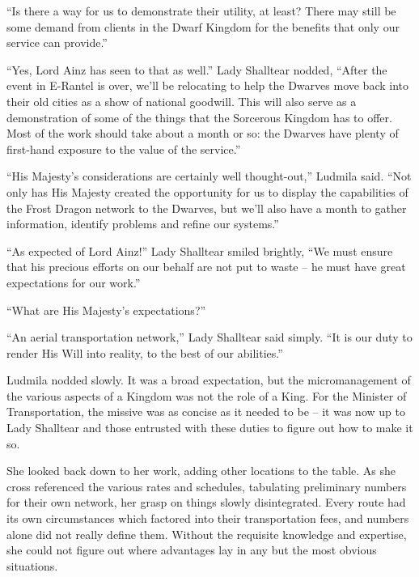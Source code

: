 “Is there a way for us to demonstrate their utility, at least? There may still be some demand from clients in the Dwarf Kingdom for the benefits that only our service can provide.”

 

“Yes, Lord Ainz has seen to that as well.” Lady Shalltear nodded, “After the event in E-Rantel is over, we’ll be relocating to help the Dwarves move back into their old cities as a show of national goodwill. This will also serve as a demonstration of some of the things that the Sorcerous Kingdom has to offer. Most of the work should take about a month or so: the Dwarves have plenty of first-hand exposure to the value of the service.”

 

“His Majesty’s considerations are certainly well thought-out,” Ludmila said. “Not only has His Majesty created the opportunity for us to display the capabilities of the Frost Dragon network to the Dwarves, but we’ll also have a month to gather information, identify problems and refine our systems.”

 

“As expected of Lord Ainz!” Lady Shalltear smiled brightly, “We must ensure that his precious efforts on our behalf are not put to waste – he must have great expectations for our work.”

 

“What are His Majesty’s expectations?”

 

“An aerial transportation network,” Lady Shalltear said simply. “It is our duty to render His Will into reality, to the best of our abilities.”

 

Ludmila nodded slowly. It was a broad expectation, but the micromanagement of the various aspects of a Kingdom was not the role of a King. For the Minister of Transportation, the missive was as concise as it needed to be – it was now up to Lady Shalltear and those entrusted with these duties to figure out how to make it so.

 

She looked back down to her work, adding other locations to the table. As she cross referenced the various rates and schedules, tabulating preliminary numbers for their own network, her grasp on things slowly disintegrated. Every route had its own circumstances which factored into their transportation fees, and numbers alone did not really define them. Without the requisite knowledge and expertise, she could not figure out where advantages lay in any but the most obvious situations.

